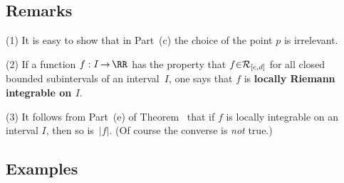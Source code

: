 {\V

        \subsection{\small{{\bf Remarks}}}
        \label{RemrkH50.70}

\V

\hspace*{\parindent}(1) It is easy to show that in Part~(c) the choice of the point $p$ is irrelevant.

\V

        (2) If a function $f:I \,{\rightarrow}\, {\RR}$ has the property that $f{\in}{\cal R}_{[c,d]}$ for all closed bounded subintervals of an interval~$I$,
    one says that $f$ is {\bf locally Riemann integrable on $I$}.

\V

        (3) It follows from Part~(e) of Theorem~ that if $f$ is locally integrable on an interval $I$, then so is~$|f|$.
    (Of course the converse is {\em not} true.)


\V
\V

        \subsection{\small{{\bf Examples}}}
        \label{DefH50.80}

\V

}
